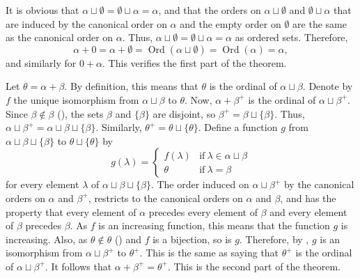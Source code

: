 \documentclass{article}
\begin{document}
It is obvious that
\(\alpha \sqcup \emptyset = \emptyset \sqcup \alpha = \alpha\), and
that the orders on \(\alpha \sqcup \emptyset\) and
\(\emptyset \sqcup \alpha\) that are induced by the canonical order on
\(\alpha\) and the empty order on \(\emptyset\) are the same as the
canonical order on \(\alpha\).  Thus,
\(\alpha \sqcup \emptyset = \emptyset \sqcup \alpha = \alpha\) as
ordered sets.  Therefore,
\begin{displaymath}
  \alpha + 0 =
  \alpha + \emptyset =
  \operatorname{Ord}(\alpha \sqcup \emptyset) =
  \operatorname{Ord}(\alpha) =
  \alpha,
\end{displaymath}
and similarly for \(0 + \alpha\).  This verifies the first part of the
theorem.

Let \(\theta = \alpha + \beta\).  By definition, this means that
\(\theta\) is the ordinal of \(\alpha \sqcup \beta\).  Denote by \(f\)
the unique isomorphism from \(\alpha \sqcup \beta\) to \(\theta\).
Now, \(\alpha + \beta^+\) is the ordinal of \(\alpha \sqcup \beta^+\).
Since \(\beta \notin \beta\) (), the sets \(\beta\)
and \(\{\beta\}\) are disjoint, so
\(\beta^+ = \beta \sqcup \{\beta\}\).  Thus,
\(\alpha \sqcup \beta^+ = \alpha \sqcup \beta \sqcup \{\beta\}\).
Similarly, \(\theta^+ = \theta \sqcup \{\theta\}\).  Define a function
\(g\) from \(\alpha \sqcup \beta \sqcup \{\beta\}\) to
\(\theta \sqcup \{\theta\}\) by
\begin{displaymath}
  g(\lambda) =
  \begin{cases}
    f(\lambda) & \text{if} ~ \lambda \in \alpha \sqcup \beta \\
    \theta & \text{if} ~ \lambda = \beta
  \end{cases}
\end{displaymath}
for every element \(\lambda\) of
\(\alpha \sqcup \beta \sqcup \{\beta\}\).  The order induced on
\(\alpha \sqcup \beta^+\) by the canonical orders on \(\alpha\) and
\(\beta^+\), restricts to the canonical orders on \(\alpha\) and
\(\beta\), and has the property that every element of \(\alpha\)
precedes every element of \(\beta\) and every element of \(\beta\)
precedes \(\beta\).  As \(f\) is an increasing function, this means
that the function \(g\) is increasing.  Also, as
\(\theta \notin \theta\) () and \(f\) is a
bijection, so is \(g\).  Therefore, by , \(g\) is
an isomorphism from \(\alpha \sqcup \beta^+\) to \(\theta^+\).  This
is the same as saying that \(\theta^+\) is the ordinal of
\(\alpha \sqcup \beta^+\).  It follows that
\(\alpha + \beta^+ = \theta^+\).  This is the second part of the
theorem.
\end{document}
